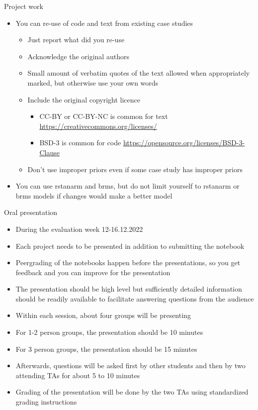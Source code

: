 \documentclass[t]{beamer}
\begin{document}
\begin{frame}
  
  {\Large\color{navyblue} Project work}
  
  \begin{itemize}
  \item You can re-use of code and text from existing case studies
    \begin{itemize}
    \item Just report what did you re-use
    \item Acknowledge the original authors
    \item Small amount of verbatim quotes of the text allowed when
      appropriately marked, but otherwise use your own words
    \item Include the original copyright licence
      \begin{itemize}
      \item CC-BY or CC-BY-NC is common for text
        \url{https://creativecommons.org/licenses/}
      \item BSD-3 is common for code
        \url{https://opensource.org/licenses/BSD-3-Clause}
      \end{itemize}
    \item Don't use improper priors even if some case study has improper priors
  \end{itemize}
  \item You can use rstanarm and brms, but do not limit yourself
    to rstanarm or brms models if changes would make a better model
  \end{itemize}
\end{frame}

\begin{frame}
  
  {\Large\color{navyblue} Oral presentation}
  
  \begin{itemize}
  \item During the evaluation week 12-16.12.2022
  \item Each project needs to be presented in addition to submitting the notebook 
  \item Peergrading of the notebooks happen before the presentations,
    so you get feedback and you can improve for the presentation
  \item The presentation should be high level but sufficiently detailed information should be readily available to facilitate answering questions from the audience
  \item Within each session, about four groups will be presenting
  \item For 1-2 person groups, the presentation should be 10 minutes
  \item For 3 person groups, the presentation should be 15 minutes 
  \item Afterwards, questions will be asked first by other students and then by two attending TAs for about 5 to 10 minutes
  \item Grading of the presentation will be done by the two TAs using standardized grading instructions
  \end{itemize}
\end{frame}
\end{document}
